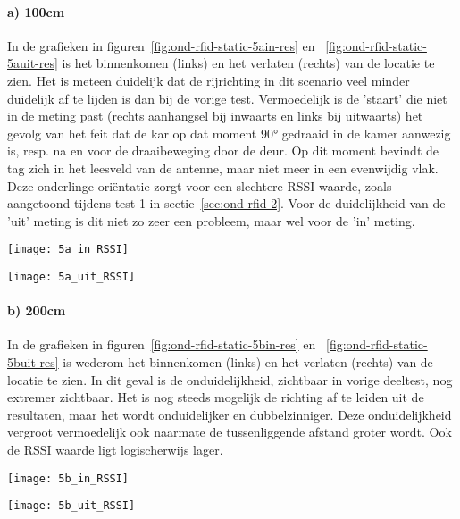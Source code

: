 \paragraph{a) 100cm}
In de grafieken in figuren~\ref{fig:ond-rfid-static-5ain-res} en ~\ref{fig:ond-rfid-static-5auit-res} is het binnenkomen (links) en het verlaten (rechts) van de locatie te zien. Het is meteen duidelijk dat de rijrichting in dit scenario veel minder duidelijk af te lijden is dan bij de vorige test. Vermoedelijk is de 'staart' die niet in de meting past (rechts aanhangsel bij inwaarts en links bij uitwaarts) het gevolg van het feit dat de kar op dat moment 90° gedraaid in de kamer aanwezig is, resp. na en voor de draaibeweging door de deur. Op dit moment bevindt de tag zich in het leesveld van de antenne, maar niet meer in een evenwijdig vlak. Deze onderlinge oriëntatie zorgt voor een slechtere RSSI waarde, zoals aangetoond tijdens test 1 in sectie~\ref{sec:ond-rfid-2}. Voor de duidelijkheid van de 'uit' meting is dit niet zo zeer een probleem, maar wel voor de 'in' meting.

\begin{minipage}{0.42\textwidth}
	\texttt{[image: 5a\_in\_RSSI]}
	\label{fig:ond-rfid-static-5ain-res}
\end{minipage}
\hfill
\begin{minipage}{0.42\textwidth}
	\texttt{[image: 5a\_uit\_RSSI]}
	\label{fig:ond-rfid-static-5auit-res}
\end{minipage}

\paragraph{b) 200cm}
In de grafieken in figuren~\ref{fig:ond-rfid-static-5bin-res} en ~\ref{fig:ond-rfid-static-5buit-res} is wederom het binnenkomen (links) en het verlaten (rechts) van de locatie te zien. In dit geval is de onduidelijkheid, zichtbaar in vorige deeltest, nog extremer zichtbaar. Het is nog steeds mogelijk de richting af te leiden uit de resultaten, maar het wordt onduidelijker en dubbelzinniger. Deze onduidelijkheid vergroot vermoedelijk ook naarmate de tussenliggende afstand groter wordt. Ook de RSSI waarde ligt logischerwijs lager.

\begin{minipage}{0.42\textwidth}
	\texttt{[image: 5b\_in\_RSSI]}
	\label{fig:ond-rfid-static-5bin-res}
\end{minipage}
\hfill
\begin{minipage}{0.42\textwidth}
	\texttt{[image: 5b\_uit\_RSSI]}
	\label{fig:ond-rfid-static-5buit-res}
\end{minipage}

